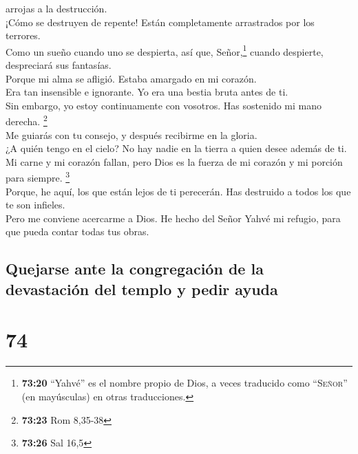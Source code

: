 arrojas a la destrucción.\\
 ¡Cómo se destruyen de repente! Están completamente
arrastrados por los terrores.\\
 Como un sueño cuando uno se despierta, así que,
Señor,\footnote{\textbf{73:20} ``Yahvé'' es el nombre propio de Dios, a
  veces traducido como ``\textsc{Señor}'' (en mayúsculas) en otras
  traducciones.} cuando despierte, despreciará sus fantasías.\\
 Porque mi alma se afligió. Estaba amargado en mi
corazón.\\
 Era tan insensible e ignorante. Yo era una bestia bruta
antes de ti.\\
 Sin embargo, yo estoy continuamente con vosotros. Has
sostenido mi mano derecha. \footnote{\textbf{73:23} Rom 8,35-38}\\
 Me guiarás con tu consejo, y después recibirme en la
gloria.\\
 ¿A quién tengo en el cielo? No hay nadie en la tierra a
quien desee además de ti.\\
 Mi carne y mi corazón fallan, pero Dios es la fuerza de
mi corazón y mi porción para siempre. \footnote{\textbf{73:26} Sal 16,5}\\
 Porque, he aquí, los que están lejos de ti perecerán.
Has destruido a todos los que te son infieles.\\
 Pero me conviene acercarme a Dios. He hecho del Señor
Yahvé mi refugio, para que pueda contar todas tus obras.

\hypertarget{quejarse-ante-la-congregaciuxf3n-de-la-devastaciuxf3n-del-templo-y-pedir-ayuda}{%
\subsection{Quejarse ante la congregación de la devastación del templo y
pedir
ayuda}\label{quejarse-ante-la-congregaciuxf3n-de-la-devastaciuxf3n-del-templo-y-pedir-ayuda}}

\hypertarget{section-72}{%
\section{74}\label{section-72}}

